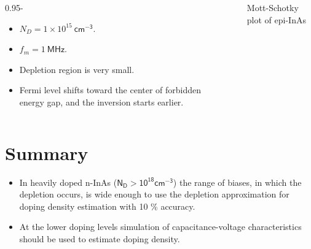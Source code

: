 \documentclass[final]{beamer}
\newcommand{\figfont}{\normalsize} %
\begin{document}
\begin{poster}
\begin{columns}[c]
        \begin{column}{0.95\columnwidth-\figwidth}
            \begin{itemize}    \itemsep20pt          
                \item $N_D = 1\times10^{15}\ \mathsf{cm^{-3}}$.
                \item $f_m=1\ \mathsf{MHz}$.
                \item Depletion region is very small.
                \item Fermi level shifts toward the
                center of forbidden energy gap, and the inversion starts earlier.
               \end{itemize}
        \end{column}
        
        \begin{column}{0.005\columnwidth}
        \end{column}   
                   
        \begin{column}{\figwidth}
             \centering
             \figfont
             
             \caption{Mott-Schotky plot of epi-InAs}  
        \end{column}
\end{columns}	

\section{Summary} \justifying
    \begin{itemize} \itemsep12pt
        \justifying
        \item     In heavily doped n-InAs ($\mathsf{N_D > 10^{18} cm^{-3}}$) the range of biases, in which the depletion occurs, is wide enough to use the depletion approximation for doping density estimation with 10  \% accuracy.
        \item At the lower doping levels simulation of capacitance-voltage characteristics should be used         to estimate doping density.
    \end{itemize}


\end{poster}
\end{document}
